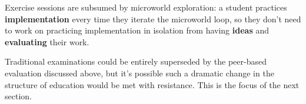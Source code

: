Exercise sessions are subsumed by microworld exploration: a student
practices \textbf{implementation} every time they iterate the microworld
loop, so they don't need to work on practicing implementation in
isolation from having \textbf{ideas} and \textbf{evaluating} their work.

Traditional examinations could be entirely superseded by the peer-based
evaluation discussed above, but it's possible such a dramatic change in
the structure of education would be met with resistance. This is the
focus of the next section.

